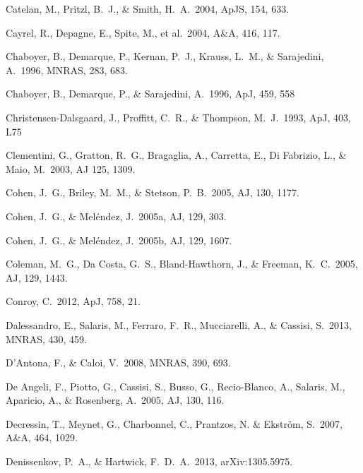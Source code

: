 \documentclass[12pt,preprint]{aastex}
\begin{document}
\begin{thebibliography}{}
Catelan, M., Pritzl, B.~J., \& Smith, H.~A.~2004, ApJS, 154, 633.

Cayrel, R., Depagne, E., Spite, M., et al.~2004, A\&A, 416, 117.

Chaboyer, B., Demarque, P., Kernan, P.~J., Krauss, L.~M., \& Sarajedini, 
 A.~1996, MNRAS, 283, 683.

Chaboyer, B., Demarque, P., \& Sarajedini, A.~1996, ApJ, 459, 558

Christensen-Dalsgaard, J., Proffitt, C.~R., \& Thompson, M.~J.~1993, ApJ,
 403, L75

Clementini, G., Gratton, R.~G., Bragaglia, A., Carretta, E., Di Fabrizio, L.,
 \& Maio, M.~2003, AJ 125, 1309.

Cohen, J.~G., Briley, M.~M., \& Stetson, P.~B.~2005, AJ, 130, 1177.

Cohen, J.~G., \& Mel\'endez, J.~2005a, AJ, 129, 303.

Cohen, J.~G., \& Mel\'endez, J.~2005b, AJ, 129, 1607.

Coleman, M.~G., Da Costa, G.~S., Bland-Hawthorn, J., \& Freeman, K.~C.~2005,
 AJ, 129, 1443.

Conroy, C.~2012, ApJ, 758, 21.

Dalessandro, E., Salaris, M., Ferraro, F.~R., Mucciarelli, A., \& Cassisi,
 S.~2013, MNRAS, 430, 459.

D'Antona, F., \& Caloi, V.~2008, MNRAS, 390, 693.

De Angeli, F., Piotto, G., Cassisi, S., Busso, G., Recio-Blanco, A., Salaris,
 M., Aparicio, A., \& Rosenberg, A.~2005, AJ, 130, 116.

Decressin, T., Meynet, G., Charbonnel, C., Prantzos, N. \& Ekstr\"om,
 S.~2007, A\&A, 464, 1029.

Denissenkov, P.~A., \& Hartwick, F.~D.~A.~2013, arXiv:1305.5975.


\end{thebibliography}
\end{document}
